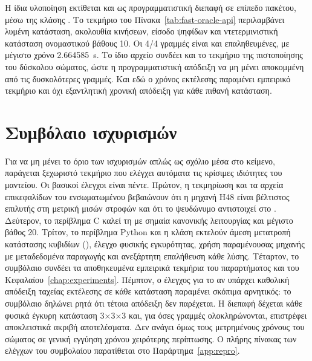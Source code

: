 Η ίδια υλοποίηση εκτίθεται και ως προγραμματιστική διεπαφή σε επίπεδο πακέτου, μέσω της κλάσης . Το τεκμήριο του Πίνακα~\ref{tab:fast-oracle-api} περιλαμβάνει λυμένη κατάσταση, ακολουθία κινήσεων, είσοδο ψηφίδων και ντετερμινιστική κατάσταση ονομαστικού βάθους 10. Οι 4/4 γραμμές είναι  και επαληθευμένες, με μέγιστο χρόνο 2.664585~s. Το ίδιο αρχείο συνδέει και το τεκμήριο της πιστοποίησης του δύσκολου σώματος, ώστε η προγραμματιστική απόδειξη να μη μένει αποκομμένη από τις δυσκολότερες γραμμές. Και εδώ ο χρόνος εκτέλεσης παραμένει εμπειρικό τεκμήριο και όχι εξαντλητική χρονική απόδειξη για κάθε πιθανή κατάσταση.

\begin{table}[htbp]\centering

\caption[Τεκμήριο της προγραμματιστικής διεπαφής του μαντείου]{Τεκμήριο της προγραμματιστικής διεπαφής  με έμπιστο πίνακα : 4/4 γραμμές  με μέγιστο χρόνο 2.664585~s. Πηγή: τεκμήριο του .}
\label{tab:fast-oracle-api}
\end{table}

\section{Συμβόλαιο ισχυρισμών}
\label{sec:experiments-h48-contract}

Για να μη μένει το όριο των ισχυρισμών απλώς ως σχόλιο μέσα στο κείμενο, παράγεται ξεχωριστό τεκμήριο που ελέγχει αυτόματα τις κρίσιμες ιδιότητες του μαντείου. Οι βασικοί έλεγχοι είναι πέντε. Πρώτον, η τεκμηρίωση και τα αρχεία επικεφαλίδων του ενσωματωμένου  βεβαιώνουν ότι η μηχανή H48 είναι βέλτιστος επιλυτής στη μετρική μισών στροφών και ότι το ψευδώνυμο  αντιστοιχεί στο . Δεύτερον, το περίβλημα C καλεί τη  με σημαία κανονικής λειτουργίας και μέγιστο βάθος 20. Τρίτον, το περίβλημα Python και η κλάση  εκτελούν άμεση μετατροπή κατάστασης κυβιδίων (), έλεγχο φυσικής εγκυρότητας, χρήση παραμένουσας μηχανής  με μεταδεδομένα παραγωγής και ανεξάρτητη επαλήθευση κάθε λύσης. Τέταρτον, το συμβόλαιο συνδέει τα αποθηκευμένα εμπειρικά τεκμήρια του παραρτήματος και του Κεφαλαίου~\ref{chap:experiments}. Πέμπτον, ο έλεγχος για το αν υπάρχει καθολική απόδειξη ταχείας εκτέλεσης σε κάθε κατάσταση παραμένει σκόπιμα αρνητικός: το συμβόλαιο δηλώνει ρητά ότι τέτοια απόδειξη δεν παρέχεται. Η διεπαφή δέχεται κάθε φυσικά έγκυρη κατάσταση 3×3×3 και, για όσες γραμμές ολοκληρώνονται, επιστρέφει αποκλειστικά ακριβή αποτελέσματα. Δεν ανάγει όμως τους μετρημένους χρόνους του σώματος σε γενική εγγύηση χρόνου χειρότερης περίπτωσης. Ο πλήρης πίνακας των ελέγχων του συμβολαίου παρατίθεται στο Παράρτημα~\ref{app:repro}.


